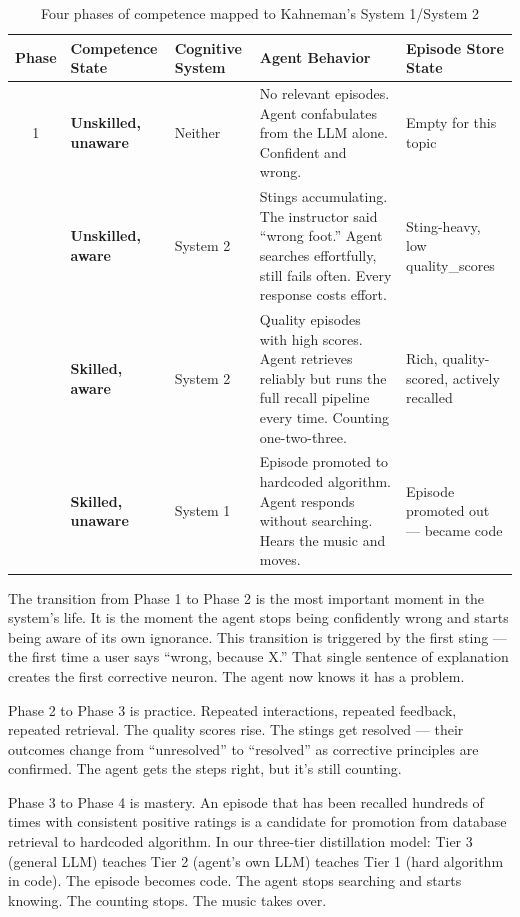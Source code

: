 \documentclass[11pt,a4paper]{article}
\begin{document}
\begin{table}[h]
\centering
\small
\begin{tabularx}{\textwidth}{c >{\raggedright}p{2cm} >{\raggedright}p{2cm} >{\raggedright}p{4cm} >{\raggedright\arraybackslash}p{3cm}}
\toprule
\textbf{Phase} & \textbf{Competence State} & \textbf{Cognitive System} & \textbf{Agent Behavior} & \textbf{Episode Store State} \\
\midrule
1 & \textbf{Unskilled, unaware} & Neither & No relevant episodes. Agent confabulates from the LLM alone. Confident and wrong. & Empty for this topic \\
\addlinespace
2 & \textbf{Unskilled, aware} & System 2 & Stings accumulating. The instructor said ``wrong foot.'' Agent searches effortfully, still fails often. Every response costs effort. & Sting-heavy, low quality\_scores \\
\addlinespace
3 & \textbf{Skilled, aware} & System 2 & Quality episodes with high scores. Agent retrieves reliably but runs the full recall pipeline every time. Counting one-two-three. & Rich, quality-scored, actively recalled \\
\addlinespace
4 & \textbf{Skilled, unaware} & System 1 & Episode promoted to hardcoded algorithm. Agent responds without searching. Hears the music and moves. & Episode promoted out --- became code \\
\bottomrule
\end{tabularx}
\caption{Four phases of competence mapped to Kahneman's System 1/System 2}
\end{table}

The transition from Phase 1 to Phase 2 is the most important moment in the system's life. It is the moment the agent stops being confidently wrong and starts being aware of its own ignorance. This transition is triggered by the first sting --- the first time a user says ``wrong, because X.'' That single sentence of explanation creates the first corrective neuron. The agent now knows it has a problem.

Phase 2 to Phase 3 is practice. Repeated interactions, repeated feedback, repeated retrieval. The quality scores rise. The stings get resolved --- their outcomes change from ``unresolved'' to ``resolved'' as corrective principles are confirmed. The agent gets the steps right, but it's still counting.

Phase 3 to Phase 4 is mastery. An episode that has been recalled hundreds of times with consistent positive ratings is a candidate for promotion from database retrieval to hardcoded algorithm. In our three-tier distillation model: Tier 3 (general LLM) teaches Tier 2 (agent's own LLM) teaches Tier 1 (hard algorithm in code). The episode becomes code. The agent stops searching and starts knowing. The counting stops. The music takes over.
\end{document}
